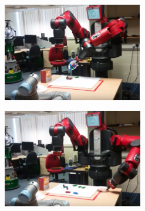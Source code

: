 \begin{figure}[H]
{\begin{subfigure}[b]{.43\textwidth}
\end{subfigure}%
\begin{subfigure}[b]{.43\textwidth}
\centering
\caption{}
\includegraphics[width=.95\textwidth, height=4.3cm]{7.png}
\end{subfigure}%
\begin{subfigure}[b]{.43\textwidth}
\centering
\caption{}
\includegraphics[width=.95\textwidth, height=4.3cm]{8.png}
\end{subfigure}%
}\\
\end{figure}
